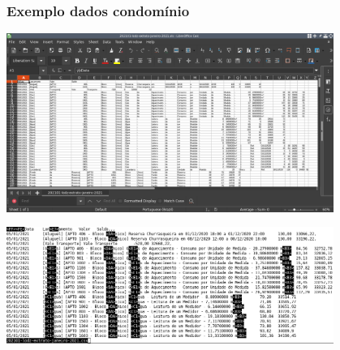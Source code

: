 \begin{frame}
\frametitle{Exemplo dados condomínio}
\centering
\includegraphics[width=0.8\textwidth,height=0.7\textheight,keepaspectratio]{examples/lodz-planilha-xls.png}

\framebreak
\includegraphics[width=0.8\textwidth,height=0.7\textheight,keepaspectratio]{examples/lodz-planilha-csv.png}

\framebreak


\framebreak


\framebreak


\framebreak


\end{frame}




